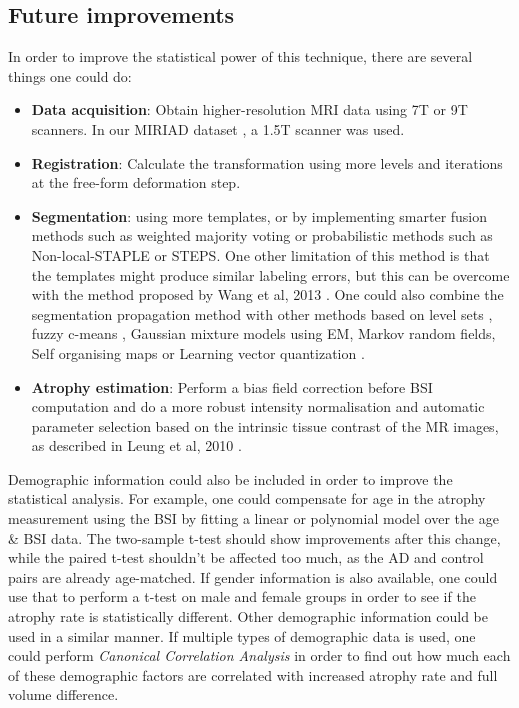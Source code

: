 \documentclass[11pt,a4paper,oneside]{report}
\begin{document}


\subsection*{Future improvements}

In order to improve the statistical power of this technique, there are several things one could do:
\begin{itemize}
 \item \textbf{Data acquisition}: Obtain higher-resolution MRI data using 7T or 9T scanners. In our MIRIAD dataset \cite{malone2013miriad}, a 1.5T scanner was used. 
 \item \textbf{Registration}: Calculate the transformation using more levels and iterations at the free-form deformation step.
 \item \textbf{Segmentation}: using more templates, or by implementing smarter fusion methods such as weighted majority voting or probabilistic methods such as Non-local-STAPLE or STEPS. One other limitation of this method is that the templates might produce similar labeling errors, but this can be overcome with the method proposed by Wang et al, 2013 \cite{wang2013multi}. One could also combine the segmentation propagation method with other methods based on level sets \cite{cremers2007review}, fuzzy c-means \cite{bezdek1984fcm}, Gaussian mixture models using EM, Markov random fields, Self organising maps \cite{bhandarkar1997multiscale} or Learning vector quantization \cite{karayiannis1999segmentation}.
 \item \textbf{Atrophy estimation}: Perform a bias field correction before BSI computation and do a more robust intensity normalisation and automatic parameter selection based on the intrinsic tissue contrast of the MR images, as described in Leung et al, 2010 \cite{leung2010robust}.
\end{itemize}

Demographic information could also be included in order to improve the statistical analysis. For example, one could compensate for age in the atrophy measurement using the BSI by fitting a linear or polynomial model over the age & BSI data. The two-sample t-test should show improvements after this change, while the paired t-test shouldn't be affected too much, as the AD and control pairs are already age-matched. If gender information is also available, one could use that to perform a t-test on male and female groups in order to see if the atrophy rate is statistically different. Other demographic information could be used in a similar manner. If multiple types of demographic data is used, one could perform \textit{Canonical Correlation Analysis} in order to find out how much each of these demographic factors are correlated with increased atrophy rate and full volume difference.




\end{document}
